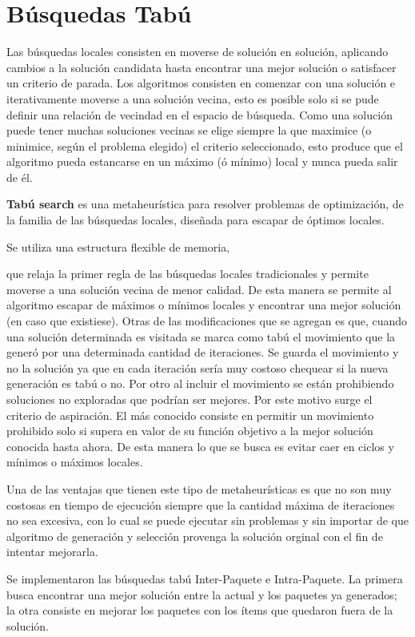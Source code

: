 \section{Búsquedas Tabú}
Las búsquedas locales consisten en moverse de solución en solución, aplicando cambios a la solución candidata hasta encontrar una mejor solución o satisfacer un criterio de parada. Los algoritmos consisten en comenzar con una solución e iterativamente moverse a una solución vecina, esto es posible solo si se pude definir una relación de vecindad en el espacio de búsqueda. Como una solución puede tener muchas soluciones vecinas se elige siempre la que maximice (o minimice, según el problema elegido) el criterio seleccionado, esto produce que el algoritmo pueda estancarse en un máximo (ó mínimo) local y nunca pueda salir de él.

\textbf{Tabú search} es una metaheurística para resolver problemas de optimización, de la familia de las búsquedas locales, diseñada para escapar de óptimos locales. 

Se utiliza una estructura flexible de memoria, 

que relaja la primer regla de las búsquedas locales tradicionales y permite moverse a una solución vecina de menor calidad. De esta manera se permite al algoritmo escapar de máximos o mínimos locales y encontrar una mejor solución (en caso que existiese). Otras de las modificaciones que se agregan es que, cuando una solución determinada es visitada se marca como tabú el movimiento que la generó por una determinada cantidad de iteraciones. Se guarda el movimiento y no la solución ya que en cada iteración sería muy costoso chequear si la nueva generación es tabú o no. Por otro al incluir el movimiento se están prohibiendo soluciones no exploradas que podrían ser mejores. Por este motivo surge el criterio de aspiración. El más conocido consiste en permitir un movimiento prohibido solo si supera en valor de su función objetivo a la mejor solución conocida hasta ahora. De esta manera lo que se busca es evitar caer en ciclos y mínimos o máximos locales.

Una de las ventajas que tienen este tipo de metaheurísticas es que no son muy costosas en tiempo de ejecución siempre que la cantidad máxima de iteraciones no sea excesiva, con lo cual se puede ejecutar sin problemas y sin importar de que algoritmo de generación y selección provenga la solución orginal con el fin de intentar mejorarla.

Se implementaron las búsquedas tabú Inter-Paquete e Intra-Paquete. La primera busca encontrar una mejor solución entre la actual y los paquetes ya generados; la otra consiste en mejorar los paquetes con los ítems que quedaron fuera de la solución.

